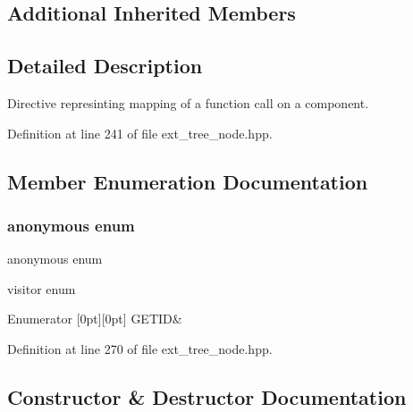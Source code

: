 \subsection*{Additional Inherited Members}


\subsection{Detailed Description}
Directive represinting mapping of a function call on a component. 

Definition at line 241 of file ext\+\_\+tree\+\_\+node.\+hpp.



\subsection{Member Enumeration Documentation}
\mbox{\label{structcall__point__hw__pragma_a287df8d4c2186e6d94e3091ee02b54de}} 
\subsubsection{\texorpdfstring{anonymous enum}{anonymous enum}}
{\footnotesize\ttfamily anonymous enum}



visitor enum 

\begin{DoxyEnumFields}{Enumerator}
[0pt][0pt]{}\mbox{\label{structcall__point__hw__pragma_a287df8d4c2186e6d94e3091ee02b54deaac08f04c6cf1e0d72239e536a75f5d23}} 
G\+E\+T\+ID&\\
\hline

\end{DoxyEnumFields}


Definition at line 270 of file ext\+\_\+tree\+\_\+node.\+hpp.



\subsection{Constructor \& Destructor Documentation}
\mbox{\label{structcall__point__hw__pragma_af59bb17d60759b9e00ad5707e893b646}} 

